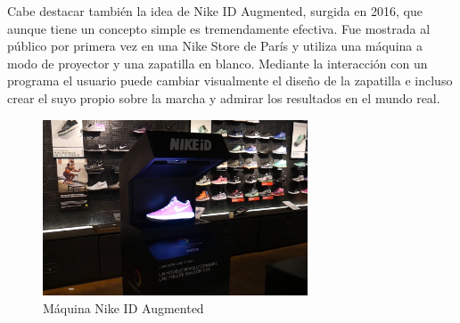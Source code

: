Cabe destacar también la idea de Nike ID Augmented, surgida en 2016, que aunque tiene un concepto simple es tremendamente efectiva. Fue mostrada al público por primera vez en una Nike Store de París y utiliza una máquina a modo de proyector y una zapatilla en blanco. Mediante la interacción con un programa el usuario puede cambiar visualmente el diseño de la zapatilla e incluso crear el suyo propio sobre la marcha y admirar los resultados en el mundo real.

\begin{figure}[H]
     \centering
     \includegraphics[width=0.7\textwidth]{Images/nikeaugmented-1.jpg}
     \caption{Máquina Nike ID Augmented}
     \label{fig:nikeAR}
 \end{figure}
